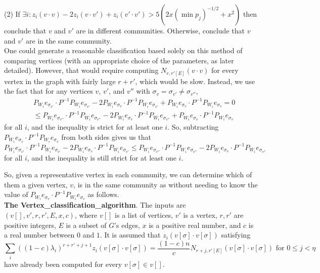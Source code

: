 \documentclass[11pt]{article}
\newcommand{\1}{\mathbb{1}}
\begin{document}
(2) If $\exists i: z_i(v\cdot v)-2z_i(v\cdot v')+z_i(v'\cdot v')> 5(2x(\min p_j)^{-1/2}+x^2)$ then conclude that $v$ and $v'$ are in different communities. Otherwise, conclude that $v$ and $v'$ are in the same community.\\

One could generate a reasonable classification based solely on this method of comparing vertices (with an appropriate choice of the parameters, as later detailed). However, that would require computing $N_{r,r'[E]}(v\cdot v)$ for every vertex in the graph with fairly large $r+r'$, which would be slow. Instead, we use the fact that for any vertices $v$, $v'$, and $v''$ with $\sigma_v=\sigma_{v'}\ne\sigma_{v''}$, 
\begin{align*}
&P_{W_i}e_{\sigma_{v'}}\cdot P^{-1}P_{W_i}e_{\sigma_{v'}}-2P_{W_i}e_{\sigma_v}\cdot P^{-1}P_{W_i}e_{\sigma_{v'}}+P_{W_i}e_{\sigma_v}\cdot P^{-1}P_{W_i}e_{\sigma_{v}}=0\\
&\le P_{W_i}e_{\sigma_{v''}}\cdot P^{-1}P_{W_i}e_{\sigma_{v''}}-2P_{W_i}e_{\sigma_v}\cdot P^{-1}P_{W_i}e_{\sigma_{v''}}+P_{W_i}e_{\sigma_v}\cdot P^{-1}P_{W_i}e_{\sigma_{v}}
\end{align*}
for all $i$, and the inequality is strict for at least one $i$. So, subtracting $P_{W_i}e_{\sigma_v}\cdot P^{-1}P_{W_i}e_{\sigma_{v}}$ from both sides gives us that
\[P_{W_i}e_{\sigma_{v'}}\cdot P^{-1}P_{W_i}e_{\sigma_{v'}}-2P_{W_i}e_{\sigma_v}\cdot P^{-1}P_{W_i}e_{\sigma_{v'}}\le P_{W_i}e_{\sigma_{v''}}\cdot P^{-1}P_{W_i}e_{\sigma_{v''}}-2P_{W_i}e_{\sigma_v}\cdot P^{-1}P_{W_i}e_{\sigma_{v''}}\]
for all $i$, and the inequality is still strict for at least one $i$.

So, given a representative vertex in each community, we can determine which of them a given vertex, $v$, is in the same community as without needing to know the value of $P_{W_i}e_{\sigma_v}\cdot P^{-1}P_{W_i}e_{\sigma_{v}}$ as follows.\\

\noindent
{\bf The Vertex\_classification\_algorithm}. The inputs are $(v[],v', r,r',E,x,c)$, where $v[]$ is a list of vertices, $v'$ is a vertex, $r,r'$ are positive integers, $E$ is a subset of $G$'s edges, $x$ is a positive real number, and $c$ is a real number between $0$ and $1$. It is assumed that $z_i(v[\sigma]\cdot v[\sigma] )$ satisfying 
\[\sum_i ((1-c)\lambda_i)^{r+r'+j+1}z_i(v[\sigma]\cdot v[\sigma])=\frac{(1-c)n}{c}N_{r+j,r'[E]}(v[\sigma]\cdot v[\sigma]) \text{ for } 0\le j<\eta\]
have already been computed for every $v[\sigma]\in v[]$. 
\end{document}
